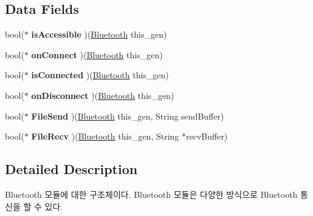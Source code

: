 \subsection*{Data Fields}
\begin{DoxyCompactItemize}
\item 
\hypertarget{struct__Bluetooth_a4d17357ef3f36198ec75747159ba463e}{bool($\ast$ {\bfseries is\-Accessible} )(\hyperlink{struct__Bluetooth}{Bluetooth} this\-\_\-gen)}\label{struct__Bluetooth_a4d17357ef3f36198ec75747159ba463e}

\item 
\hypertarget{struct__Bluetooth_a02ed8ce853ef7914c2d0663ddc85bf71}{bool($\ast$ {\bfseries on\-Connect} )(\hyperlink{struct__Bluetooth}{Bluetooth} this\-\_\-gen)}\label{struct__Bluetooth_a02ed8ce853ef7914c2d0663ddc85bf71}

\item 
\hypertarget{struct__Bluetooth_afaf7348f13265482f31f6bb326de23d3}{bool($\ast$ {\bfseries is\-Connected} )(\hyperlink{struct__Bluetooth}{Bluetooth} this\-\_\-gen)}\label{struct__Bluetooth_afaf7348f13265482f31f6bb326de23d3}

\item 
\hypertarget{struct__Bluetooth_a73fc8eb303afc5b6d5e9188e623f8d3d}{bool($\ast$ {\bfseries on\-Disconnect} )(\hyperlink{struct__Bluetooth}{Bluetooth} this\-\_\-gen)}\label{struct__Bluetooth_a73fc8eb303afc5b6d5e9188e623f8d3d}

\item 
\hypertarget{struct__Bluetooth_a32031c7a682e3eb8ccce66942ae01104}{bool($\ast$ {\bfseries File\-Send} )(\hyperlink{struct__Bluetooth}{Bluetooth} this\-\_\-gen, String send\-Buffer)}\label{struct__Bluetooth_a32031c7a682e3eb8ccce66942ae01104}

\item 
\hypertarget{struct__Bluetooth_ab7586458920997808d8564b5d337a60b}{bool($\ast$ {\bfseries File\-Recv} )(\hyperlink{struct__Bluetooth}{Bluetooth} this\-\_\-gen, String $\ast$recv\-Buffer)}\label{struct__Bluetooth_ab7586458920997808d8564b5d337a60b}

\end{DoxyCompactItemize}


\subsection{Detailed Description}
Bluetooth 모듈에 대한 구조체이다. Bluetooth 모듈은 다양한 방식으로 Bluetooth 통신을 할 수 있다. 

